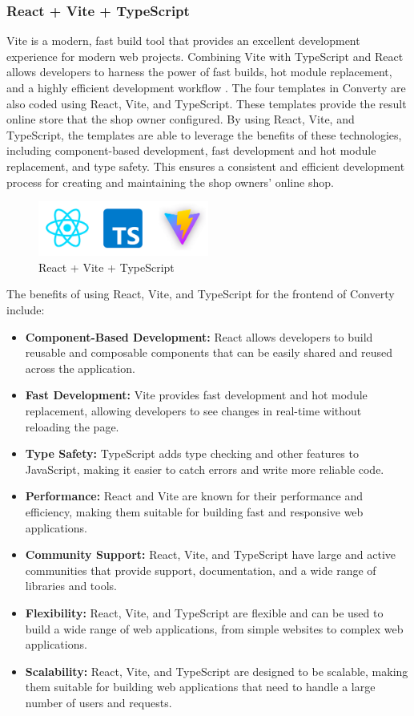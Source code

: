 \subsubsection{React + Vite + TypeScript}
Vite is a modern, fast build tool that provides an excellent development experience for modern web projects. Combining Vite with TypeScript and React allows developers to harness the power of fast builds, hot module replacement, and a highly efficient development workflow \cite{vite}. The four templates in Converty are also coded using React, Vite, and TypeScript. These templates provide the result online store that the shop owner configured. By using React, Vite, and TypeScript, the templates are able to leverage the benefits of these technologies, including component-based development, fast development and hot module replacement, and type safety. This ensures a consistent and efficient development process for creating and maintaining the shop owners' online shop.

\begin{figure}[H]
    \centering
    \includegraphics[width=0.5\textwidth]{Images/reactViteTs.png}
    \caption{React + Vite + TypeScript}
    \label{fig:reactViteTypeScript}
\end{figure}

The benefits of using React, Vite, and TypeScript for the frontend of Converty include:

\begin{itemize}
    \item \textbf{Component-Based Development:} React allows developers to build reusable and composable components that can be easily shared and reused across the application.
    \item \textbf{Fast Development:} Vite provides fast development and hot module replacement, allowing developers to see changes in real-time without reloading the page.
    \item \textbf{Type Safety:} TypeScript adds type checking and other features to JavaScript, making it easier to catch errors and write more reliable code.
    \item \textbf{Performance:} React and Vite are known for their performance and efficiency, making them suitable for building fast and responsive web applications.
    \item \textbf{Community Support:} React, Vite, and TypeScript have large and active communities that provide support, documentation, and a wide range of libraries and tools.
    \item \textbf{Flexibility:} React, Vite, and TypeScript are flexible and can be used to build a wide range of web applications, from simple websites to complex web applications.
    \item \textbf{Scalability:} React, Vite, and TypeScript are designed to be scalable, making them suitable for building web applications that need to handle a large number of users and requests.
\end{itemize}

